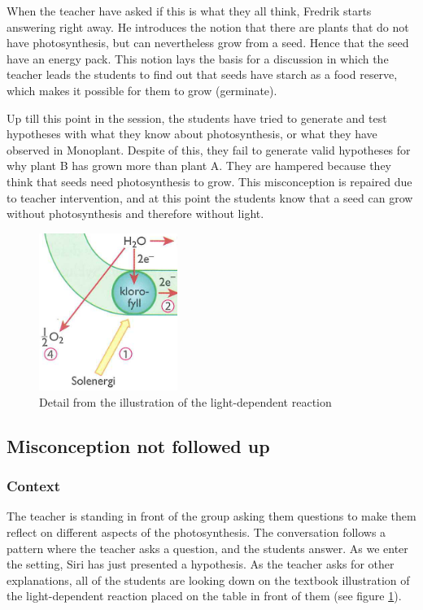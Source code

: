 When the teacher have asked if this is what they all think, Fredrik starts answering right away. He introduces the notion that there are plants that do not have photosynthesis, but can nevertheless grow from a seed. Hence that the seed have an energy pack. This notion lays the basis for a discussion in which the teacher leads the students to find out that seeds have starch as a food reserve, which makes it possible for them to grow (germinate). 

Up till this point in the session, the students have tried to generate and test hypotheses with what they know about photosynthesis, or what they have observed in Monoplant. Despite of this, they fail to generate valid hypotheses for why plant B has grown more than plant A. They are hampered because they think that seeds need photosynthesis to grow. This misconception is repaired due to teacher intervention, and at this point the students know that a seed can grow without photosynthesis and therefore without light.

\begin{figure}
\centering
\includegraphics[width=0.4\textwidth]{img/data_analysis/light_dependent_detail.png}
\caption{Detail from the illustration of the light-dependent reaction \citep{bios}}
\label{fig:lightdependentdetail}
\end{figure}

\subsection{Misconception not followed up}

\subsubsection*{Context}
The teacher is standing in front of the group asking them questions to make them reflect on different aspects of the photosynthesis. The conversation follows a pattern where the teacher asks a question, and the students answer. As we enter the setting, Siri has just presented a hypothesis. As the teacher asks for other explanations, all of the students are looking down on the textbook illustration of the light-dependent reaction placed on the table in front of them (see figure \ref{fig:lightdependentdetail}). 

